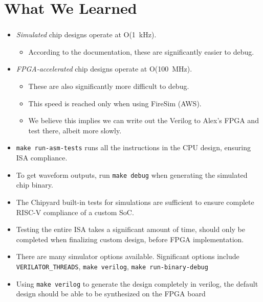 \documentclass{../weeklyslides}
\begin{document}
\section{What We Learned}\label{sec:What_We_Learned}
\begin{frame}
  \frametitle{}
  \begin{itemize}
  \item \emph{Simulated} chip designs operate at O(\SI{1}{\kilo\hertz}).
    \begin{itemize}
    \item According to the documentation, these are significantly easier to debug.
    \end{itemize}
  \item \emph{FPGA-accelerated} chip designs operate at O(\SI{100}{\mega\hertz}).
    \begin{itemize}
    \item These are also significantly more difficult to debug.
    \item This speed is reached only when using FireSim (AWS).
    \item We believe this implies we can write out the Verilog to Alex's FPGA and test there, albeit more slowly.
    \end{itemize}
  \item \texttt{make run-asm-tests} runs all the instructions in the CPU design, ensuring ISA compliance.
  \item To get waveform outputs, run \texttt{make debug} when generating the simulated chip binary.
  \end{itemize}
\end{frame}

\begin{frame}
  \begin{itemize}
  \item The Chipyard built-in tests for simulations are sufficient to ensure complete RISC-V compliance of a custom SoC.
  \item Testing the entire ISA takes a significant amount of time, should only be completed when finalizing custom design, before FPGA implementation.
  \item There are many simulator options available. Significant options include \texttt{VERILATOR\_THREADS}, \texttt{make verilog}, \texttt{make run-binary-debug}
  \item Using \texttt{make verilog} to generate the design completely in verilog, the default design should be able to be synthesized on the FPGA board
  \end{itemize}
\end{frame}
\end{document}

